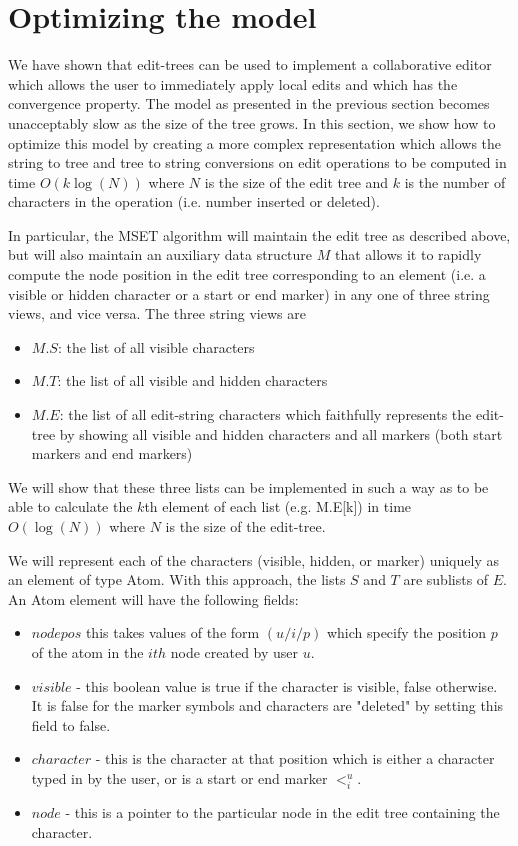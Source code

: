 \documentclass{amsart}
\begin{document}
\section{Optimizing the model}

We have shown that edit-trees can be used to implement a collaborative editor
which allows the user to immediately apply local edits and which has the convergence
property.  The model as presented in the previous section becomes unacceptably slow as the size of the tree grows.  In this section, we show how to optimize this model by creating a more complex representation which allows
the string to tree and tree to string conversions on edit operations to be computed
in time $O(k\log(N))$ where $N$ is the size of the edit tree and $k$ is the number
of characters in the operation (i.e. number inserted or deleted).

In particular, the MSET algorithm will maintain the edit tree as described above,
but will also maintain an auxiliary data structure $M$ that allows it to rapidly
compute the node position in the edit tree corresponding to an element (i.e. a visible or hidden character or a start or end marker) in any one
of three string views, and vice versa. The three string views are
\begin{itemize}
\item $M.S$: the list of all visible characters
\item $M.T$: the list of all visible and hidden characters
\item $M.E$: the list of all edit-string characters which faithfully represents the edit-tree by showing all visible and hidden characters and all markers (both
start markers and end markers)
\end{itemize}
We will show that these three lists can be implemented in such a way as to be able
to calculate the $k$th element of each list (e.g. M.E[k]) in time $O(\log(N))$ where $N$ is the size of the edit-tree.

We will represent each of the characters (visible, hidden, or marker) uniquely as an
element of type Atom.  With this approach, the lists $S$ and $T$ are sublists of $E$.
An Atom element will have the following fields:
\begin{itemize}
\item $nodepos$ this takes values of the form $(u/i/p)$ which specify the position $p$ of the atom in the $ith$ node created by user $u$.
\item $visible$ - this boolean value is true if the character is visible, false otherwise. It is false for the marker symbols and characters are "deleted" by setting this field to false.
\item $character$ - this is the character at that position which is either a character typed in by the user, or is a start or end marker $<^u_i$.
\item $node$ - this is a pointer to the particular node in the edit tree containing the character.
\end{itemize}
\end{document}
